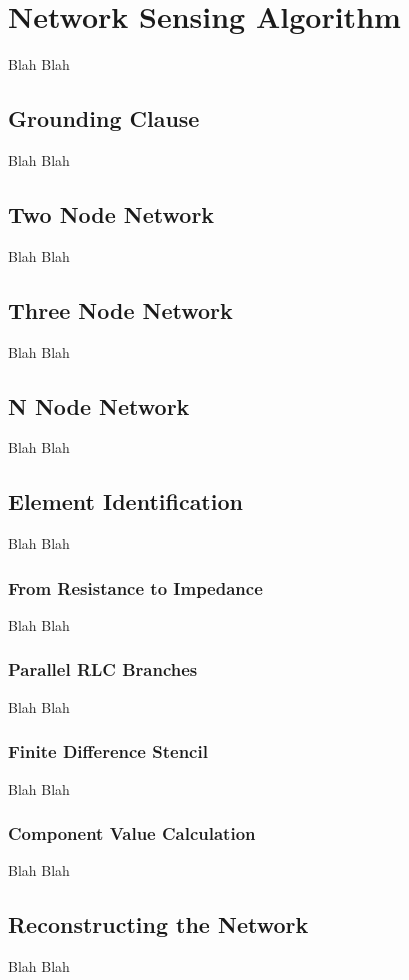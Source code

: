 %
\chapter{Network Sensing Algorithm}

Blah Blah

\section{Grounding Clause}

Blah Blah

\section{Two Node Network}

Blah Blah

\section{Three Node Network}

Blah Blah

\section{N Node Network}

Blah Blah

\section{Element Identification}
Blah Blah
\subsection{From Resistance to Impedance}
Blah Blah
\subsection{Parallel RLC Branches}
Blah Blah
\subsection{Finite Difference Stencil}
Blah Blah
\subsection{Component Value Calculation}
Blah Blah

\section{Reconstructing the Network}

Blah Blah
%